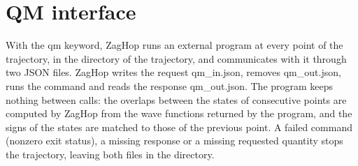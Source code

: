 \documentclass{report}
\begin{document}
\section*{QM interface} \label{sec:interface}
With the qm keyword, ZagHop runs an external program at every point of the trajectory, in the directory of the trajectory, and communicates with it through two JSON files. ZagHop writes the request qm\_in.json, removes qm\_out.json, runs the command and reads the response qm\_out.json. The program keeps nothing between calls: the overlaps between the states of consecutive points are computed by ZagHop from the wave functions returned by the program, and the signs of the states are matched to those of the previous point. A failed command (nonzero exit status), a missing response or a missing requested quantity stops the trajectory, leaving both files in the directory.
\end{document}
